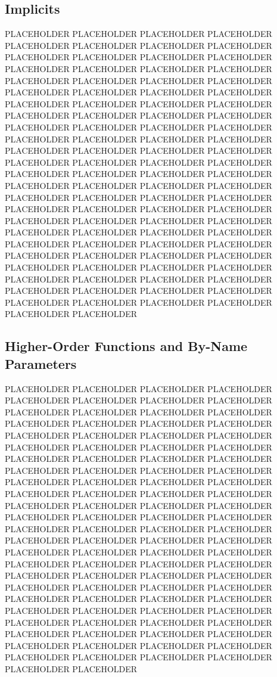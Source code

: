 \subsection{Implicits}

PLACEHOLDER PLACEHOLDER PLACEHOLDER PLACEHOLDER PLACEHOLDER PLACEHOLDER PLACEHOLDER PLACEHOLDER PLACEHOLDER PLACEHOLDER PLACEHOLDER PLACEHOLDER PLACEHOLDER PLACEHOLDER PLACEHOLDER PLACEHOLDER PLACEHOLDER PLACEHOLDER PLACEHOLDER PLACEHOLDER PLACEHOLDER PLACEHOLDER PLACEHOLDER PLACEHOLDER PLACEHOLDER PLACEHOLDER PLACEHOLDER PLACEHOLDER PLACEHOLDER PLACEHOLDER PLACEHOLDER PLACEHOLDER PLACEHOLDER PLACEHOLDER PLACEHOLDER PLACEHOLDER PLACEHOLDER PLACEHOLDER PLACEHOLDER PLACEHOLDER PLACEHOLDER PLACEHOLDER PLACEHOLDER PLACEHOLDER PLACEHOLDER PLACEHOLDER PLACEHOLDER PLACEHOLDER PLACEHOLDER PLACEHOLDER PLACEHOLDER PLACEHOLDER PLACEHOLDER PLACEHOLDER PLACEHOLDER PLACEHOLDER PLACEHOLDER PLACEHOLDER PLACEHOLDER PLACEHOLDER PLACEHOLDER PLACEHOLDER PLACEHOLDER PLACEHOLDER PLACEHOLDER PLACEHOLDER PLACEHOLDER PLACEHOLDER PLACEHOLDER PLACEHOLDER PLACEHOLDER PLACEHOLDER PLACEHOLDER PLACEHOLDER PLACEHOLDER PLACEHOLDER PLACEHOLDER PLACEHOLDER PLACEHOLDER PLACEHOLDER PLACEHOLDER PLACEHOLDER PLACEHOLDER PLACEHOLDER PLACEHOLDER PLACEHOLDER PLACEHOLDER PLACEHOLDER PLACEHOLDER PLACEHOLDER PLACEHOLDER PLACEHOLDER PLACEHOLDER PLACEHOLDER PLACEHOLDER PLACEHOLDER PLACEHOLDER PLACEHOLDER

\subsection{Higher-Order Functions and By-Name Parameters}

PLACEHOLDER PLACEHOLDER PLACEHOLDER PLACEHOLDER PLACEHOLDER PLACEHOLDER PLACEHOLDER PLACEHOLDER PLACEHOLDER PLACEHOLDER PLACEHOLDER PLACEHOLDER PLACEHOLDER PLACEHOLDER PLACEHOLDER PLACEHOLDER PLACEHOLDER PLACEHOLDER PLACEHOLDER PLACEHOLDER PLACEHOLDER PLACEHOLDER PLACEHOLDER PLACEHOLDER PLACEHOLDER PLACEHOLDER PLACEHOLDER PLACEHOLDER PLACEHOLDER PLACEHOLDER PLACEHOLDER PLACEHOLDER PLACEHOLDER PLACEHOLDER PLACEHOLDER PLACEHOLDER PLACEHOLDER PLACEHOLDER PLACEHOLDER PLACEHOLDER PLACEHOLDER PLACEHOLDER PLACEHOLDER PLACEHOLDER PLACEHOLDER PLACEHOLDER PLACEHOLDER PLACEHOLDER PLACEHOLDER PLACEHOLDER PLACEHOLDER PLACEHOLDER PLACEHOLDER PLACEHOLDER PLACEHOLDER PLACEHOLDER PLACEHOLDER PLACEHOLDER PLACEHOLDER PLACEHOLDER PLACEHOLDER PLACEHOLDER PLACEHOLDER PLACEHOLDER PLACEHOLDER PLACEHOLDER PLACEHOLDER PLACEHOLDER PLACEHOLDER PLACEHOLDER PLACEHOLDER PLACEHOLDER PLACEHOLDER PLACEHOLDER PLACEHOLDER PLACEHOLDER PLACEHOLDER PLACEHOLDER PLACEHOLDER PLACEHOLDER PLACEHOLDER PLACEHOLDER PLACEHOLDER PLACEHOLDER PLACEHOLDER PLACEHOLDER PLACEHOLDER PLACEHOLDER PLACEHOLDER PLACEHOLDER PLACEHOLDER PLACEHOLDER PLACEHOLDER PLACEHOLDER PLACEHOLDER PLACEHOLDER PLACEHOLDER PLACEHOLDER
